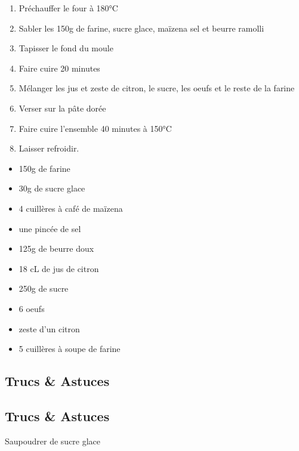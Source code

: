     \begin{minipage}{.7\textwidth}
        \begin{enumerate}
            \item Préchauffer le four à 180°C
	    \item Sabler les 150g de farine, sucre glace, maïzena sel et beurre ramolli
	    \item Tapisser le fond du moule
	    \item Faire cuire 20 minutes
	    \item Mélanger les jus et zeste de citron, le sucre, les oeufs et le reste de la farine
	    \item Verser sur la pâte dorée
	    \item Faire cuire l'ensemble 40 minutes à 150°C
	    \item Laisser refroidir.

        \end{enumerate}
    \end{minipage}
    \begin{minipage}{.3\textwidth}
        \begin{flushleft}
        \begin{itemize}
            \item 150g de farine
	    \item 30g de sucre glace
	    \item 4 cuillères à café de maïzena
	    \item une pincée de sel
	    \item 125g de beurre doux
	    \item 18 cL de jus de citron
	    \item 250g de sucre
	    \item 6 oeufs
	    \item zeste d'un citron
	    \item 5 cuillères à soupe de farine

        \end{itemize}
        \end{flushleft}
    \end{minipage}
    
    \vspace{1cm}
    \hline
    \vspace{1cm}
    
    \subsection{Trucs \& Astuces}
        \subsection{Trucs \& Astuces}
	Saupoudrer de sucre glace
